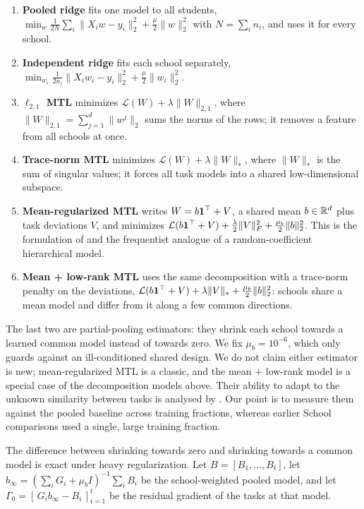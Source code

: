\begin{enumerate}[leftmargin=*]
\item \textbf{Pooled ridge} fits one model to all students, $\min_w \frac{1}{2N} \sum_i \lVert X_i w - y_i \rVert_2^2 + \frac{\mu}{2} \lVert w \rVert_2^2$ with $N = \sum_i n_i$, and uses it for every school.
\item \textbf{Independent ridge} fits each school separately, $\min_{w_i} \frac{1}{2 n_i} \lVert X_i w_i - y_i \rVert_2^2 + \frac{\mu}{2} \lVert w_i \rVert_2^2$.
\item \textbf{$\ell_{2,1}$ MTL} minimizes $\mathcal{L}(W) + \lambda \lVert W \rVert_{2,1}$, where $\lVert W \rVert_{2,1} = \sum_{j=1}^{d} \lVert w^{j} \rVert_2$ sums the norms of the rows; it removes a feature from all schools at once.
\item \textbf{Trace-norm MTL} minimizes $\mathcal{L}(W) + \lambda \lVert W \rVert_*$, where $\lVert W \rVert_*$ is the sum of singular values; it forces all task models into a shared low-dimensional subspace.
\item \textbf{Mean-regularized MTL} writes $W = b \mathbf{1}^\top + V$, a shared mean $b \in \mathbb{R}^d$ plus task deviations $V$, and minimizes $\mathcal{L}(b \mathbf{1}^\top + V) + \frac{\lambda}{2} \lVert V \rVert_F^2 + \frac{\mu_b}{2} \lVert b \rVert_2^2$. This is the formulation of \citet{evgeniou2004regularized} and the frequentist analogue of a random-coefficient hierarchical model.
\item \textbf{Mean + low-rank MTL} uses the same decomposition with a trace-norm penalty on the deviations, $\mathcal{L}(b \mathbf{1}^\top + V) + \lambda \lVert V \rVert_* + \frac{\mu_b}{2} \lVert b \rVert_2^2$: schools share a mean model and differ from it along a few common directions.
\end{enumerate}

The last two are partial-pooling estimators: they shrink each school towards a learned common model instead of towards zero. We fix $\mu_b = 10^{-6}$, which only guards against an ill-conditioned shared design. We do not claim either estimator is new; mean-regularized MTL is a classic, and the mean + low-rank model is a special case of the decomposition models above. Their ability to adapt to the unknown similarity between tasks is analysed by \citet{duan2023adaptive}. Our point is to measure them against the pooled baseline across training fractions, whereas earlier School comparisons used a single, large training fraction.

The difference between shrinking towards zero and shrinking towards a common model is exact under heavy regularization. Let $B = [B_1, \dots, B_t]$, let $b_\infty = (\sum_i G_i + \mu_b I)^{-1} \sum_i B_i$ be the school-weighted pooled model, and let $\Gamma_0 = [\,G_i b_\infty - B_i\,]_{i=1}^{t}$ be the residual gradient of the tasks at that model.

